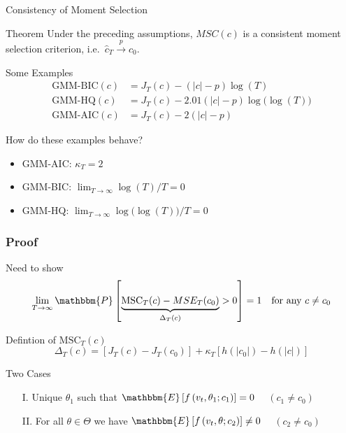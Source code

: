 \begin{frame}{Consistency of Moment Selection}

  \small
\begin{alertblock}{Theorem}
	Under the preceding assumptions, $MSC(c)$ is a consistent moment selection criterion, i.e.\ $\widehat{c}_T \overset{p}{\rightarrow} c_0$.
\end{alertblock}

\begin{block}{Some Examples}
  \vspace{-1em}
  \begin{align*}
    \mbox{GMM-BIC}(c) &= J_T(c) - \left( |c|-p \right)\log(T)\\
    \mbox{GMM-HQ}(c) &= J_T(c) - 2.01\left( |c|-p \right)\log\big(\log(T)\big)\\
    \mbox{GMM-AIC}(c) &= J_T(c) - 2\left( |c|-p \right)
  \end{align*}
\end{block}

\begin{alertblock}{How do these examples behave?}
  \vspace{-1em}
  \begin{itemize}
    \item GMM-AIC: $\kappa_T = 2$ 
    \item GMM-BIC: $\lim_{T\rightarrow \infty} \log(T)/T =0$ \alert{\checkmark}
    \item GMM-HQ: $\lim_{T\rightarrow \infty} \log\big(\log(T)\big)/T = 0$ \alert{\checkmark}
  \end{itemize}
\end{alertblock}

\end{frame}
\begin{frame}
  \frametitle{Proof}
  \begin{alertblock}{Need to show}
  \vspace{-1.5em}
  \[
    \lim_{T\rightarrow \infty} \mathbbm{P}\left[ \underbrace{\text{MSC}_T(c) - MSE_T(c_0)}_{\Delta_T(c)} >0 \right] = 1 \quad \text{for any } c \neq c_0
  \]
\end{alertblock}

\begin{block}{Defintion of $\text{MSC}_T(c)$}
  \vspace{-1.5em}
\[\Delta_T(c) = \left[ J_T(c) - J_T(c_0)  \right] + \kappa_T \left[h(|c_0|) - h(|c|)  \right]\]
\end{block}

\begin{block}{Two Cases}
  \begin{enumerate}
    \item[I.] Unique $\theta_1$ such that $\mathbbm{E}\left[ f\left( v_t,\theta_1;c_1 \right) \right] = 0\quad$ $(c_1 \neq c_0)$ 
  \item[II.] For all $\theta \in \Theta$ we have $\mathbbm{E}\left[ f\left( v_t, \theta;c_2 \right) \right]\neq 0\quad$ $(c_2 \neq c_0)$ 
  \end{enumerate}
\end{block}

\end{frame}
